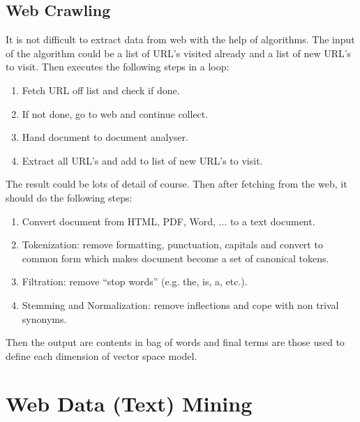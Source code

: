 \documentclass[sigconf]{acmart}
\begin{document}
\subsection{Web Crawling}
It is not difficult to extract data from web with the help of algorithms. The input of the algorithm could be a list of URL’s visited already and a list of new URL’s to visit. Then executes the following steps in a loop:
\begin{enumerate}
\item Fetch URL off list and check if done.
\item If not done, go to web and continue collect.
\item Hand document to document analyser.
\item Extract all URL's and add to list of new URL's to visit.
\end{enumerate}
The result could be lots of detail of course. Then after fetching from the web, it should do the following steps:
\begin{enumerate}
\item Convert document from HTML, PDF, Word, $\ldots$ to a text document.
\item Tokenization: remove formatting, punctuation, capitals and convert to common form which makes document become a set of canonical tokens.
\item Filtration: remove ``stop words'' (e.g. the, is, a, etc.).
\item Stemming and Normalization: remove inflections and cope with non trival synonyms.
\end{enumerate}
Then the output are contents in bag of words and final terms are those used to define each dimension of vector space model.

\section{Web Data (Text) Mining}
\end{document}
